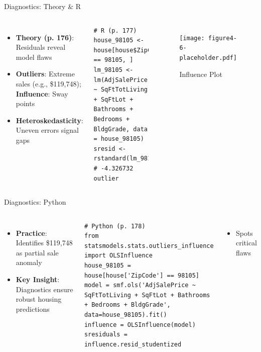 \documentclass{beamer}
\begin{document}
	\begin{frame}[fragile]{Diagnostics: Theory \& R}
		\begin{columns}
			\begin{itemize}
				\item \textbf{Theory (p. 176)}: Residuals reveal model flaws
				\item \textbf{Outliers}: Extreme sales (e.g., \$119,748); \textbf{Influence}: Sway points
				\item \textbf{Heteroskedasticity}: Uneven errors signal gaps
			\end{itemize}
			\begin{lstlisting}
# R (p. 177)
house_98105 <- house[house$ZipCode == 98105, ]
lm_98105 <- lm(AdjSalePrice ~ SqFtTotLiving + SqFtLot + Bathrooms +
Bedrooms + BldgGrade, data = house_98105)
sresid <- rstandard(lm_98105)  # -4.326732 outlier
			\end{lstlisting}
			\begin{figure}
				\texttt{[image: figure4-6-placeholder.pdf]}
				\caption{Influence Plot}
			\end{figure}
		\end{columns}
	\end{frame}
	
	\begin{frame}[fragile]{Diagnostics: Python}
		\lstset{language=Python}
		\begin{columns}
			\column{0.6\textwidth}
			\begin{itemize}
				\item \textbf{Practice}: Identifies \$119,748 as partial sale anomaly
				\item \textbf{Key Insight}: Diagnostics ensure robust housing predictions
			\end{itemize}
			\begin{lstlisting}
# Python (p. 178)
from statsmodels.stats.outliers_influence import OLSInfluence
house_98105 = house[house['ZipCode'] == 98105]
model = smf.ols('AdjSalePrice ~ SqFtTotLiving + SqFtLot + Bathrooms + Bedrooms + BldgGrade', data=house_98105).fit()
influence = OLSInfluence(model)
sresiduals = influence.resid_studentized
			\end{lstlisting}
			\column{0.4\textwidth}
			\begin{itemize}
				\item Spots critical flaws
			\end{itemize}
		\end{columns}
	\end{frame}
	
\end{document}
